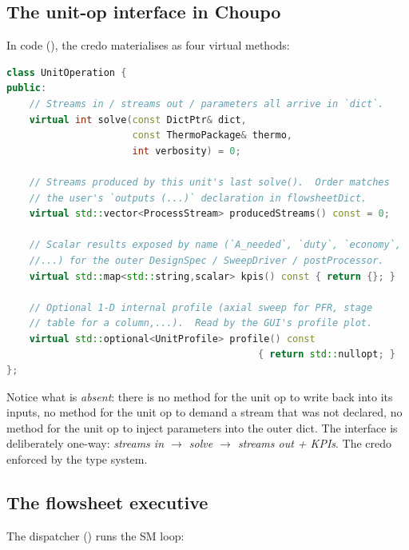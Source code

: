 \documentclass[11pt,a4paper]{article}
\begin{document}
\subsection{The unit-op interface in Choupo}

In code (), the credo
materialises as four virtual methods:

\begin{lstlisting}[language=c++]
class UnitOperation {
public:
    // Streams in / streams out / parameters all arrive in `dict`.
    virtual int solve(const DictPtr& dict,
                      const ThermoPackage& thermo,
                      int verbosity) = 0;

    // Streams produced by this unit's last solve().  Order matches
    // the user's `outputs (...)` declaration in flowsheetDict.
    virtual std::vector<ProcessStream> producedStreams() const = 0;

    // Scalar results exposed by name (`A_needed`, `duty`, `economy`,
    //...) for the outer DesignSpec / SweepDriver / postProcessor.
    virtual std::map<std::string,scalar> kpis() const { return {}; }

    // Optional 1-D internal profile (axial sweep for PFR, stage
    // table for a column,...).  Read by the GUI's profile plot.
    virtual std::optional<UnitProfile> profile() const
                                            { return std::nullopt; }
};
\end{lstlisting}

\noindent Notice what is \emph{absent}: there is no method for the
unit op to write back into its inputs, no method for the unit op
to demand a stream that was not declared, no method for the unit
op to inject parameters into the outer dict.  The interface is
deliberately one-way: \emph{streams in $\to$ solve $\to$ streams
out + KPIs}.  The credo enforced by the type system.

\subsection{The flowsheet executive}

The dispatcher ()
runs the SM loop:
\end{document}
